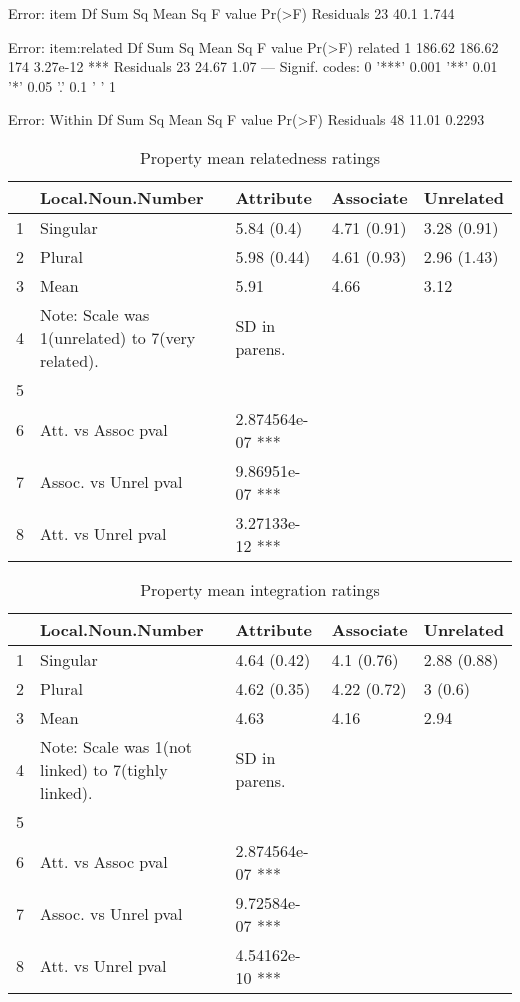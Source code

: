 \documentclass[a4paper,11pt]{article}\usepackage[]{graphicx}\usepackage[]{color}
\begin{document}
Error: item
          Df Sum Sq Mean Sq F value Pr(>F)
Residuals 23   40.1   1.744               

Error: item:related
          Df Sum Sq Mean Sq F value   Pr(>F)    
related    1 186.62  186.62     174 3.27e-12 ***
Residuals 23  24.67    1.07                     
---
Signif. codes:  0 '***' 0.001 '**' 0.01 '*' 0.05 '.' 0.1 ' ' 1

Error: Within
          Df Sum Sq Mean Sq F value Pr(>F)
Residuals 48  11.01  0.2293               
\begin{table}[ht]
\centering
\begin{tabular}{rllll}
  \hline
 & Local.Noun.Number & Attribute & Associate & Unrelated \\ 
  \hline
1 & Singular & 5.84 (0.4) & 4.71 (0.91) & 3.28 (0.91) \\ 
  2 & Plural & 5.98 (0.44) & 4.61 (0.93) & 2.96 (1.43) \\ 
  3 & Mean & 5.91 & 4.66 & 3.12 \\ 
  4 & Note: Scale was 1(unrelated) to 7(very related). & SD in parens. &  &  \\ 
  5 &  &  &  &  \\ 
  6 & Att. vs Assoc pval & 2.874564e-07 *** &  &  \\ 
  7 & Assoc. vs Unrel pval & 9.86951e-07 *** &  &  \\ 
  8 & Att. vs Unrel pval & 3.27133e-12 *** &  &  \\ 
   \hline
\end{tabular}
\caption[PROP Relatedness]{Property mean relatedness ratings} 
\end{table}


\begin{table}[ht]
\centering
\begin{tabular}{rllll}
  \hline
 & Local.Noun.Number & Attribute & Associate & Unrelated \\ 
  \hline
1 & Singular & 4.64 (0.42) & 4.1 (0.76) & 2.88 (0.88) \\ 
  2 & Plural & 4.62 (0.35) & 4.22 (0.72) & 3 (0.6) \\ 
  3 & Mean & 4.63 & 4.16 & 2.94 \\ 
  4 & Note: Scale was 1(not linked) to 7(tighly linked). & SD in parens. &  &  \\ 
  5 &  &  &  &  \\ 
  6 & Att. vs Assoc pval & 2.874564e-07 *** &  &  \\ 
  7 & Assoc. vs Unrel pval & 9.72584e-07 *** &  &  \\ 
  8 & Att. vs Unrel pval & 4.54162e-10 *** &  &  \\ 
   \hline
\end{tabular}
\caption[PROP Integration]{Property mean integration ratings} 
\end{table}
\end{document}
